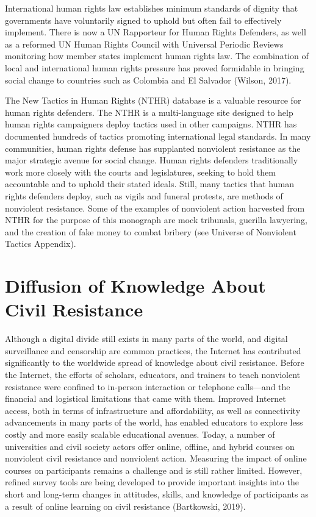 \documentclass[twoside,a4paper,12pt,fleqn,openany]{extbook}
\begin{document}
International human rights law establishes minimum standards of dignity that governments have voluntarily signed to uphold but often fail to effectively implement. There is now a UN Rapporteur for Human Rights Defenders, as well as a reformed UN Human Rights Council with Universal Periodic Reviews monitoring how member states implement human rights law. The combination of local and international human rights pressure has proved formidable in bringing social change to countries such as Colombia and El Salvador (Wilson, 2017).

The New Tactics in Human Rights (NTHR) database is a valuable resource for human rights defenders. The NTHR is a multi-language site designed to help human rights campaigners deploy tactics used in other campaigns. NTHR has documented hundreds of tactics promoting international legal standards. In many communities, human rights defense has supplanted nonviolent resistance as the major strategic avenue for social change. Human rights defenders traditionally work more closely with the courts and legislatures, seeking to hold them accountable and to uphold their stated ideals. Still, many tactics that human rights defenders deploy, such as vigils and funeral protests, are methods of nonviolent resistance. Some of the examples of nonviolent action harvested from NTHR for the purpose of this
monograph are mock tribunals, guerilla lawyering, and the creation of fake money to combat bribery (see Universe of Nonviolent Tactics Appendix).

\section*{Diffusion of Knowledge About Civil Resistance}

Although a digital divide still exists in many parts of the world, and digital surveillance and censorship are common practices, the Internet has contributed significantly to the worldwide spread of knowledge about civil resistance. Before the Internet, the efforts of scholars, educators, and trainers to teach nonviolent resistance were confined to in-person interaction or telephone calls—and the financial and logistical limitations that came with them. Improved Internet access, both in terms of infrastructure and affordability, as well as connectivity advancements in many parts of the world, has enabled educators to explore less costly and more easily scalable educational avenues. Today, a number of universities and civil society actors offer online, offline, and hybrid courses on nonviolent civil resistance and nonviolent action. Measuring the impact of online courses on participants remains a challenge and is still rather limited. However, refined survey tools are being developed to provide important insights into the short and long-term changes in attitudes, skills, and knowledge of participants as a result of online learning on civil resistance (Bartkowski, 2019).
\end{document}
